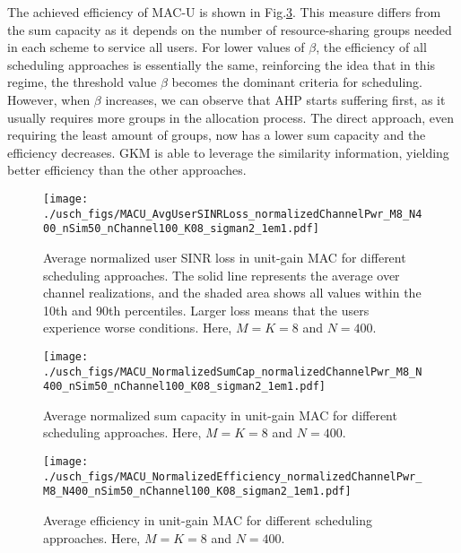 The achieved efficiency of MAC-U is shown in Fig.\ref{fig:MACU_efficiency_M8_N400}. This measure differs from the sum capacity as it depends on the number of resource-sharing groups needed in each scheme to service all users. For lower values of $\beta$, the efficiency of all scheduling approaches is essentially the same, reinforcing the idea that in this regime, the threshold value $\beta$ becomes the dominant criteria for scheduling. However, when $\beta$ increases, we can observe that AHP starts suffering first, as it usually requires more groups in the allocation process. The direct approach, even requiring the least amount of groups, now has a lower sum capacity and the efficiency decreases. GKM is able to leverage the similarity information, yielding better efficiency than the other approaches.
\begin{figure}[tb]
	\centering
	\texttt{[image: ./usch\_figs/MACU\_AvgUserSINRLoss\_normalizedChannelPwr\_M8\_N400\_nSim50\_nChannel100\_K08\_sigman2\_1em1.pdf]}
	\caption{Average normalized user SINR loss in unit-gain MAC for different scheduling approaches. The solid line represents the average over channel realizations, and the shaded area shows all values within the 10th and 90th percentiles. Larger loss means that the users experience worse conditions. Here, $M=K=8$ and $N=400$.}
	\label{fig:MACU_sinrLoss_M8_N400}
\end{figure}
\begin{figure}[tb]
	\centering
	\texttt{[image: ./usch\_figs/MACU\_NormalizedSumCap\_normalizedChannelPwr\_M8\_N400\_nSim50\_nChannel100\_K08\_sigman2\_1em1.pdf]}
	\caption{Average normalized sum capacity in unit-gain MAC for different scheduling approaches. Here, $M=K=8$ and $N=400$.}
	\label{fig:MACU_sumcapacity_M8_N400}
\end{figure}
\begin{figure}[tb]
	\centering
	\texttt{[image: ./usch\_figs/MACU\_NormalizedEfficiency\_normalizedChannelPwr\_M8\_N400\_nSim50\_nChannel100\_K08\_sigman2\_1em1.pdf]}
	\caption{Average efficiency in unit-gain MAC for different scheduling approaches. Here, $M=K=8$ and $N=400$.}
	\label{fig:MACU_efficiency_M8_N400}
\end{figure}



